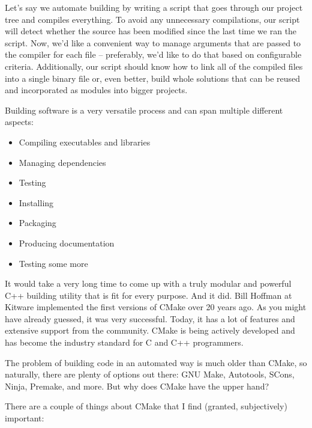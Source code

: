
Let’s say we automate building by writing a script that goes through our project tree and compiles everything. To avoid any unnecessary compilations, our script will detect whether the source has been modified since the last time we ran the script. Now, we’d like a convenient way to manage arguments that are passed to the compiler for each file – preferably, we’d like to do that based on configurable criteria. Additionally, our script should know how to link all of the compiled files into a single binary file or, even better, build whole solutions that can be reused and incorporated as modules into bigger projects.

Building software is a very versatile process and can span multiple different aspects:

\begin{itemize}
\item
Compiling executables and libraries

\item
Managing dependencies

\item
Testing

\item
Installing

\item
Packaging

\item
Producing documentation

\item
Testing some more
\end{itemize}

It would take a very long time to come up with a truly modular and powerful C++ building utility that is fit for every purpose. And it did. Bill Hoffman at Kitware implemented the first versions of CMake over 20 years ago. As you might have already guessed, it was very successful. Today, it has a lot of features and extensive support from the community. CMake is being actively developed and has become the industry standard for C and C++ programmers.

The problem of building code in an automated way is much older than CMake, so naturally, there are plenty of options out there: GNU Make, Autotools, SCons, Ninja, Premake, and more. But why does CMake have the upper hand?

There are a couple of things about CMake that I find (granted, subjectively) important:

